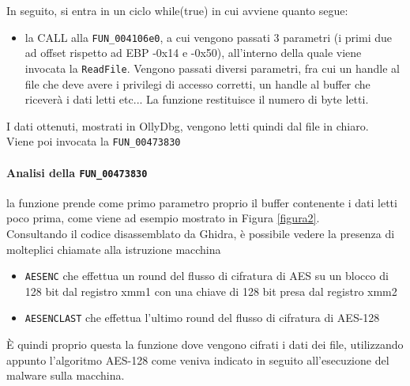 \documentclass[12pt]{extarticle}
\begin{document}
In seguito, si entra in un ciclo while(true) in cui avviene quanto segue:
\begin{itemize}
    \item la CALL alla \texttt{FUN\_004106e0}, a cui vengono passati 3 parametri (i primi due ad offset rispetto ad EBP -0x14 e -0x50), all'interno della quale viene invocata la \texttt{ReadFile}. Vengono passati diversi parametri, fra cui un handle al file che deve avere i privilegi di accesso corretti, un handle al buffer che riceverà i dati letti etc... La funzione restituisce il numero di byte letti.
\end{itemize}
I dati ottenuti, mostrati in OllyDbg, vengono letti quindi dal file in chiaro.\\Viene poi invocata la \texttt{FUN\_00473830} 

\paragraph{Analisi della \texttt{\texttt{FUN\_00473830}}} la funzione prende come primo parametro proprio il buffer contenente i dati letti poco prima, come viene ad esempio mostrato in Figura \ref{figura2}.\\Consultando il codice disassemblato da Ghidra, è possibile vedere la presenza di molteplici chiamate alla istruzione macchina 
\begin{itemize}
        \item \texttt{AESENC} che effettua un round del flusso di cifratura di AES su un blocco di 128 bit dal registro xmm1 con una chiave di 128 bit presa dal registro xmm2 
        \item \texttt{AESENCLAST} che effettua l'ultimo round del flusso di cifratura di AES-128
\end{itemize}
È quindi proprio questa la funzione dove vengono cifrati i dati dei file, utilizzando appunto l'algoritmo AES-128 come veniva indicato in seguito all'esecuzione del malware sulla macchina.  
\end{document}
